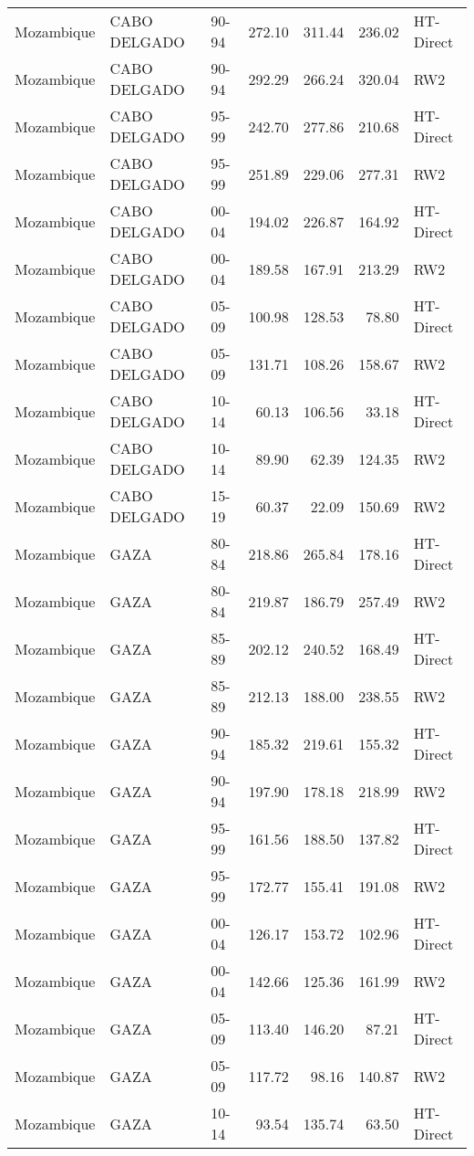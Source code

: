 \begin{longtable}{lllrrrl}
  Mozambique & CABO DELGADO & 90-94 & 272.10 & 311.44 & 236.02 & HT-Direct \\ 
  Mozambique & CABO DELGADO & 90-94 & 292.29 & 266.24 & 320.04 & RW2 \\ 
  Mozambique & CABO DELGADO & 95-99 & 242.70 & 277.86 & 210.68 & HT-Direct \\ 
  Mozambique & CABO DELGADO & 95-99 & 251.89 & 229.06 & 277.31 & RW2 \\ 
  Mozambique & CABO DELGADO & 00-04 & 194.02 & 226.87 & 164.92 & HT-Direct \\ 
  Mozambique & CABO DELGADO & 00-04 & 189.58 & 167.91 & 213.29 & RW2 \\ 
  Mozambique & CABO DELGADO & 05-09 & 100.98 & 128.53 & 78.80 & HT-Direct \\ 
  Mozambique & CABO DELGADO & 05-09 & 131.71 & 108.26 & 158.67 & RW2 \\ 
  Mozambique & CABO DELGADO & 10-14 & 60.13 & 106.56 & 33.18 & HT-Direct \\ 
  Mozambique & CABO DELGADO & 10-14 & 89.90 & 62.39 & 124.35 & RW2 \\ 
  Mozambique & CABO DELGADO & 15-19 & 60.37 & 22.09 & 150.69 & RW2 \\ 
  Mozambique & GAZA & 80-84 & 218.86 & 265.84 & 178.16 & HT-Direct \\ 
  Mozambique & GAZA & 80-84 & 219.87 & 186.79 & 257.49 & RW2 \\ 
  Mozambique & GAZA & 85-89 & 202.12 & 240.52 & 168.49 & HT-Direct \\ 
  Mozambique & GAZA & 85-89 & 212.13 & 188.00 & 238.55 & RW2 \\ 
  Mozambique & GAZA & 90-94 & 185.32 & 219.61 & 155.32 & HT-Direct \\ 
  Mozambique & GAZA & 90-94 & 197.90 & 178.18 & 218.99 & RW2 \\ 
  Mozambique & GAZA & 95-99 & 161.56 & 188.50 & 137.82 & HT-Direct \\ 
  Mozambique & GAZA & 95-99 & 172.77 & 155.41 & 191.08 & RW2 \\ 
  Mozambique & GAZA & 00-04 & 126.17 & 153.72 & 102.96 & HT-Direct \\ 
  Mozambique & GAZA & 00-04 & 142.66 & 125.36 & 161.99 & RW2 \\ 
  Mozambique & GAZA & 05-09 & 113.40 & 146.20 & 87.21 & HT-Direct \\ 
  Mozambique & GAZA & 05-09 & 117.72 & 98.16 & 140.87 & RW2 \\ 
  Mozambique & GAZA & 10-14 & 93.54 & 135.74 & 63.50 & HT-Direct \\ 

\end{longtable}
